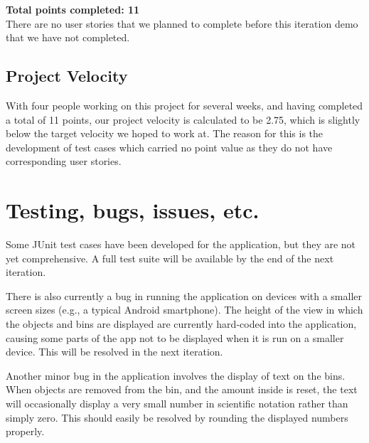 \documentclass[11pt]{article}
\begin{document}
\textbf{Total points completed:  11} \\

There are no user stories that we planned to complete before this iteration demo
that we have not completed.

\subsection{Project Velocity}

With four people working on this project for several weeks, and having completed
a total of 11 points, our project velocity is calculated to be 2.75, which is
slightly below the target velocity we hoped to work at.  The reason for this is
the development of test cases which carried no point value as they do not have
corresponding user stories.

\section{Testing, bugs, issues, etc.}

Some JUnit test cases have been developed for the application, but they are not
yet comprehensive.  A full test suite will be available by the end of the next
iteration.

There is also currently a bug in running the application on devices with a
smaller screen sizes (e.g., a typical Android smartphone).  The height of the
view in which the objects and bins are displayed are currently hard-coded into
the application, causing some parts of the app not to be displayed when it is
run on a smaller device.  This will be resolved in the next iteration.

Another minor bug in the application involves the display of text on the bins.
When objects are removed from the bin, and the amount inside is reset, the
text will occasionally display a very small number in scientific notation
rather than simply zero.  This should easily be resolved by rounding the
displayed numbers properly.
\end{document}
